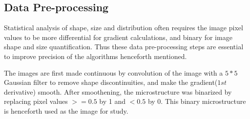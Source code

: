 \documentclass[12pt, a4paper]{report}
\begin{document}
\subsection{Data Pre-processing}
Statistical analysis of shape, size and distribution often requires the image pixel values to be more differential for gradient calculations, and binary for image shape and size quantification. Thus these data pre-processing steps are essential to improve precision of the algorithms henceforth mentioned.

The images are first made continuous by convolution of the image with a $5*5$ Gaussian filter to remove shape discontinuities, and make the gradient($1st$ derivative) smooth. After smoothening, the microstructure was binarized by replacing pixel values $>=0.5$ by 1 and $<0.5$ by 0. This binary microstructure is henceforth used as the image for study.
\end{document}

